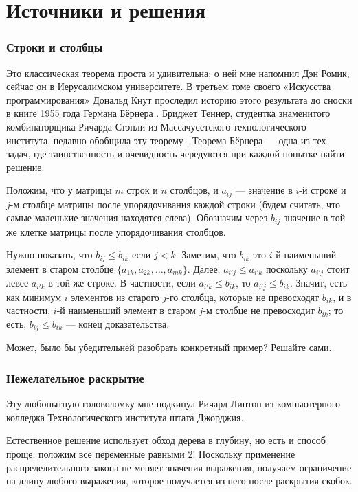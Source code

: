 \section*{Источники и решения}

\subsubsection*{Строки и столбцы}

Это классическая теорема проста и удивительна; о ней мне напомнил Дэн Ромик, сейчас он в Иерусалимском университете.
В третьем томе своего «Искусства программирования» \cite{41} Дональд Кнут проследил историю этого результата до сноски в книге 1955 года Германа Бёрнера \cite{7}.
Бриджет Теннер, студентка знаменитого комбинаторщика Ричарда Стэнли из Массачусетского технологического института, недавно обобщила эту теорему \cite{57}.
Теорема Бёрнера --- одна из тех задач, где таинственность и очевидность чередуются при каждой попытке найти решение.

Положим, что у матрицы $m$ строк и $n$ столбцов, и $a_{ij}$ --- значение в $i$-й строке и $j$-м столбце матрицы
после упорядочивания каждой строки (будем считать, что самые маленькие значения находятся слева).
Обозначим через $b_{ij}$ значение в той же клетке матрицы после упорядочивания столбцов.

Нужно показать, что $b_{ij} \le b_{ik}$ если $j < k$.
Заметим, что $b_{ik}$ это $i$-й наименьший элемент в старом столбце $\{a_{1k}, a_{2k}, \dots, a_{mk}\}$.
Далее, $a_{i'j}\le a_{i'k}$ поскольку $a_{i'j}$ стоит левее $a_{i'k}$ в той же строке.
В частности, если $a_{i'k}\le b_{ik}$, то $a_{i'j}\le b_{ik}$.
Значит, есть как минимум $i$ элементов из старого $j$-го столбца, которые не превосходят $b_{ik}$,
и в частности, $i$-й наименьший элемент в старом $j$-м столбце не превосходит $b_{ik}$;
то есть, $b_{ij} \le b_{ik}$ --- конец доказательства.

Может, было бы убедительней разобрать конкретный пример?
Решайте сами.

\subsubsection*{Нежелательное раскрытие}

Эту любопытную головоломку мне подкинул Ричард Липтон из компьютерного колледжа Технологического института штата Джорджия.

Естественное решение использует обход дерева в глубину, но есть и способ проще:
положим все переменные равными 2!
Поскольку применение распределительного закона не меняет значения выражения, получаем ограничение на длину любого выражения, которое получается из него после раскрытия скобок.


